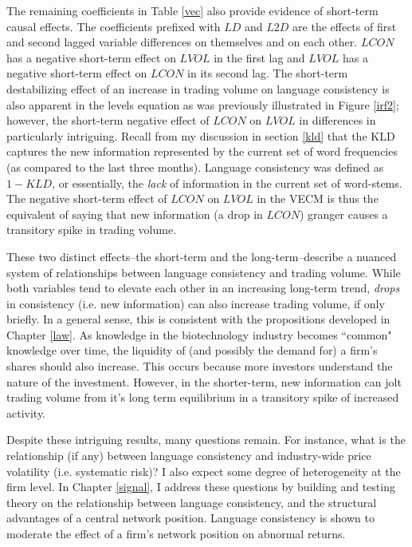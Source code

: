 The remaining coefficients in Table \ref{vec} also provide evidence of short-term causal effects. The coefficients prefixed with $LD$ and $L2D$ are the effects of first and second lagged variable differences on themselves and on each other. $LCON$ has a negative short-term effect on $LVOL$ in the first lag and $LVOL$ has a negative short-term effect on $LCON$ in its second lag. The short-term destabilizing effect of an increase in trading volume on language consistency is also apparent in the levels equation as was previously illustrated in Figure \ref{irf2}; however, the short-term negative effect of $LCON$ on $LVOL$ in differences in particularly intriguing. Recall from my discussion in section \ref{kld} that the KLD captures the new information represented by the current set of word frequencies (as compared to the last three months). Language consistency was defined as $1-KLD$, or essentially, the \emph{lack} of information in the current set of word-stems. The negative short-term effect of $LCON$ on $LVOL$ in the VECM is thus the equivalent of saying that new information (a drop in $LCON$) granger causes a transitory spike in trading volume.

These two distinct effects--the short-term and the long-term--describe a nuanced system of relationships between language consistency and trading volume. While both variables tend to elevate each other in an increasing long-term trend, \emph{drops} in consistency (i.e. new information) can also increase trading volume, if only briefly. In a general sense, this is consistent with the propositions developed in Chapter \ref{law}. As knowledge in the  biotechnology industry becomes ``common" knowledge over time, the liquidity of (and possibly the demand for) a firm's shares should also increase. This occurs because more investors understand the nature of the investment. However, in the shorter-term, new information can jolt trading volume from it's long term equilibrium in a transitory spike of increased activity.

Despite these intriguing results, many questions remain. For instance, what is the relationship (if any) between language consistency and industry-wide price volatility (i.e. systematic risk)? I also expect some degree of heterogeneity at the firm level. In Chapter \ref{signal}, I address these questions by building and testing theory on the relationship between language consistency, and the structural advantages of a central network position. Language consistency is shown to moderate the effect of a firm's network position on abnormal returns.


